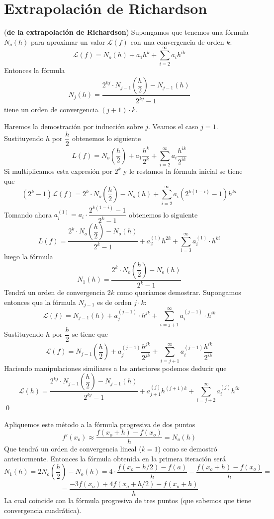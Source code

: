 \section{Extrapolación de Richardson}
\begin{met}(\textbf{de la extrapolación de Richardson})
Supongamos que tenemos una fórmula $N_o(h)$ para aproximar un valor $\mathcal{L}(f)$ con una convergencia de orden $k$:
$$\mathcal{L}(f)=N_o(h)+a_1h^k+\sum_{i=2}^{\infty}a_ih^{ik}$$
Entonces la fórmula
\begin{align}
N_j(h)=\dfrac{2^{kj}\cdot N_{j-1}\left(\dfrac{h}{2}\right)-N_{j-1}(h)}{2^{kj}-1}
 \label{richardson}
\end{align}
tiene un orden de convergencia $(j+1)\cdot k$.
\end{met}
\begin{dem}
Haremos la demostración por inducción sobre $j$. Veamos el caso $j=1$. Sustituyendo $h$ por $\dfrac{h}{2}$ obtenemos lo siguiente
$$L(f)=N_o\left(\dfrac{h}{2}\right)+a_1\dfrac{h^k}{2^k}+\sum_{i=2}^{\infty}a_i\dfrac{h^{ik}}{2^{ik}}$$
Si multiplicamos esta expresión por $2^k$ y le restamos la fórmula inicial se tiene que
$$(2^k-1)\mathcal{L}(f)=2^k\cdot N_o\left(\dfrac{h}{2}\right)-N_o(h)+\sum_{i=2}^\infty a_i(2^{k(1-i)}-1)h^{ki}$$
Tomando ahora $a_i^{(1)}=a_i\cdot \dfrac{2^{k(1-i)}-1}{2^k-1}$ obtenemos lo siguiente
$$L(f)=\dfrac{2^{k}\cdot N_o\left(\dfrac{h}{2}\right)-N_{o}(h)}{2^k-1}+a_2^{(1)}h^{2k}+\sum_{i=3}^\infty a_i^{(1)}\cdot h^{ki}$$
luego la fórmula
$$N_1(h)=\dfrac{2^{k}\cdot N_o\left(\dfrac{h}{2}\right)-N_{o}(h)}{2^k-1}$$
Tendrá un orden de convergencia $2k$ como queríamos demostrar. Supongamos entonces que la fórmula $N_{j-1}$ es de orden $j\cdot k$:
$$\mathcal{L}(f)=N_{j-1}(h)+a_j^{(j-1)}\cdot h^{jk}+\sum_{i=j+1}^{\infty}a_i^{(j-1)}\cdot h^{ik}$$
Sustituyendo $h$ por $\dfrac{h}{2}$ se tiene que
$$\mathcal{L}(f)=N_{j-1}\left(\dfrac{h}{2}\right)+a_j^{(j-1)}\dfrac{h^{jk}}{2^{jk}}+\sum_{i=j+1}^{\infty}a_i^{(j-1)}\dfrac{h^{ik}}{2^{ik}}$$
Haciendo manipulaciones similiares a las anteriores podemos deducir que
$$\mathcal{L}(h)=\dfrac{2^{kj}\cdot N_{j-1}\left(\dfrac{h}{2}\right)-N_{j-1}(h)}{2^{kj}-1}+a_{j+1}^{(j)}h^{(j+1)k}+\sum_{i=j+2}^{\infty}a_i^{(j)}h^{ik}$$
\qed\end{dem}
\begin{ejem}
Apliquemos este método a la fórmula progresiva de dos puntos
$$f'(x_o)\approx\dfrac{f(x_o+h)-f(x_o)}{h}=N_o(h)$$
Que tendrá un orden de convergencia lineal ($k=1$) como se demostró anteriormente. Entonces la fórmula obtenida en la primera iteración será
$$N_1(h)=2N_o\left(\dfrac{h}{2}\right)-N_o(h)=4\cdot\dfrac{f(x_o+h/2)-f(a)}{h}-\dfrac{f(x_o+h)-f(x_o)}{h}=$$
$$=\dfrac{-3f(x_o)+4f(x_o+h/2)-f(x_o+h)}{h}$$
La cual coincide con la fórmula progresiva de tres puntos (que sabemos que tiene convergencia cuadrática).
\end{ejem}

